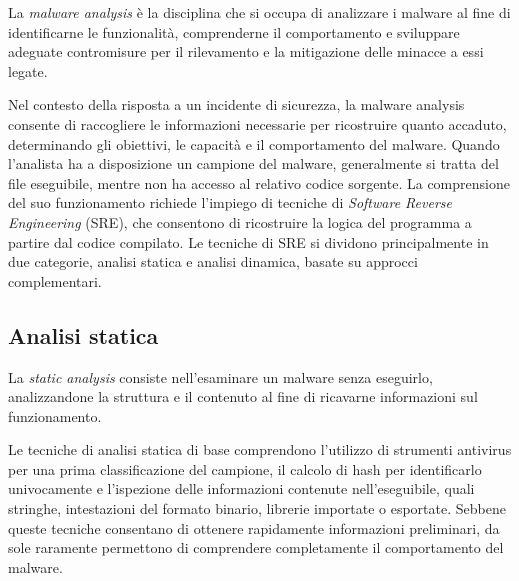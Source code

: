 La \emph{malware analysis} \cite{sikorski2012malware} è la disciplina che si occupa di analizzare i malware al fine di identificarne le funzionalità, comprenderne il comportamento e sviluppare adeguate contromisure per il rilevamento e la mitigazione delle minacce a essi legate. %

Nel contesto della risposta a un incidente di sicurezza, la malware analysis consente di raccogliere le informazioni necessarie per ricostruire quanto accaduto, determinando gli obiettivi, le capacità e il comportamento del malware. Quando l'analista ha a disposizione un campione del malware, generalmente si tratta del file eseguibile, mentre non ha accesso al relativo codice sorgente. La comprensione del suo funzionamento richiede l'impiego di tecniche di \emph{Software Reverse Engineering} (SRE), che consentono di ricostruire la logica del programma a partire dal codice compilato. Le tecniche di SRE si dividono principalmente in due categorie, analisi statica e analisi dinamica, basate su approcci complementari.



\subsection{Analisi statica} %

La \emph{static analysis} \cite{sikorski2012malware} consiste nell'esaminare un malware senza eseguirlo, analizzandone la struttura e il contenuto al fine di ricavarne informazioni sul funzionamento. %

Le tecniche di analisi statica di base comprendono l'utilizzo di strumenti antivirus per una prima classificazione del campione, il calcolo di hash per identificarlo univocamente e l'ispezione delle informazioni contenute nell'eseguibile, quali stringhe, intestazioni del formato binario, librerie importate o esportate. Sebbene queste tecniche consentano di ottenere rapidamente informazioni preliminari, da sole raramente permettono di comprendere completamente il comportamento del malware.

